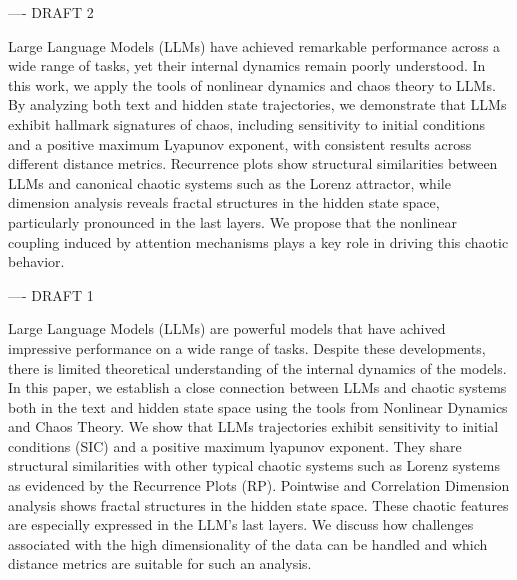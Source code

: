 ---- DRAFT 2

Large Language Models (LLMs) have achieved remarkable performance across a wide range of tasks, yet their internal dynamics remain poorly understood. In this work, we apply the tools of nonlinear dynamics and chaos theory to LLMs. By analyzing both text and hidden state trajectories, we demonstrate that LLMs exhibit hallmark signatures of chaos, including sensitivity to initial conditions and a positive maximum Lyapunov exponent, with consistent results across different distance metrics. Recurrence plots show structural similarities between LLMs and canonical chaotic systems such as the Lorenz attractor, while dimension analysis reveals fractal structures in the hidden state space, particularly pronounced in the last layers. We propose that the nonlinear coupling induced by attention mechanisms plays a key role in driving this chaotic behavior. 


---- DRAFT 1


Large Language Models (LLMs) are powerful models that have achived impressive performance on a wide range of tasks.
Despite these developments, there is limited theoretical understanding of the internal dynamics of the models. In this paper, we establish a close connection between LLMs and chaotic systems both in the text and hidden state space using the tools from Nonlinear Dynamics and Chaos Theory. We show that LLMs 
trajectories exhibit sensitivity to initial conditions (SIC) and a positive maximum lyapunov exponent. They share structural similarities with other typical chaotic systems such as Lorenz systems as evidenced by the Recurrence Plots (RP). Pointwise and Correlation Dimension analysis shows fractal structures in the hidden state space. These chaotic features are especially expressed in the LLM's last layers. We discuss how challenges associated with the high dimensionality of the data can be handled and which distance metrics are suitable for such an analysis.


